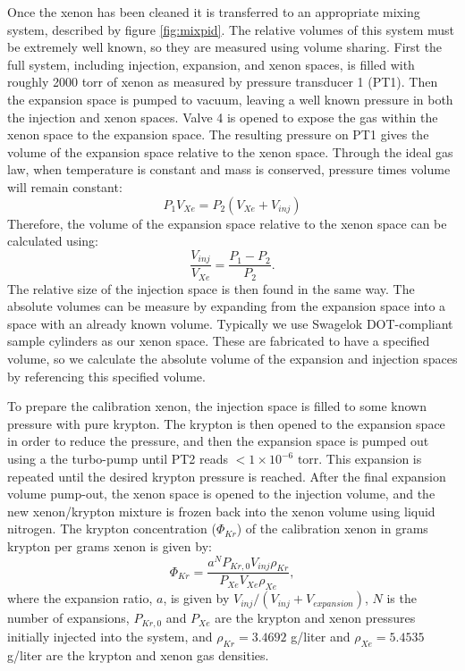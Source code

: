 Once the xenon has been cleaned it is transferred to an appropriate mixing system, described by figure \ref{fig:mixpid}. The relative volumes of this system must be extremely well known, so they are measured using volume sharing. First the full system, including injection, expansion, and xenon spaces, is filled with roughly 2000 torr of xenon as measured by pressure transducer 1 (PT1). Then the expansion space is pumped to vacuum, leaving a well known pressure in both the injection and xenon spaces. Valve 4 is opened to expose the gas within the xenon space to the expansion space. The resulting pressure on PT1 gives the volume of the expansion space relative to the xenon space. Through the ideal gas law, when temperature is constant and mass is conserved, pressure times volume will remain constant:
\begin{equation}
P_{1}V_{Xe} = P_{2}(V_{Xe}+V_{inj})
\end{equation}
Therefore, the volume of the expansion space relative to the xenon space can be calculated using:
\begin{equation}
\frac{V_{inj}}{V_{Xe}} = \frac{P_{1}-P_{2}}{P_{2}}.
\end{equation}
The relative size of the injection space is then found in the same way. The absolute volumes can be measure by expanding from the expansion space into a space with an already known volume. Typically we use Swagelok DOT-compliant sample cylinders as our xenon space. These are fabricated to have a specified volume, so we calculate the absolute volume of the expansion and injection spaces by referencing this specified volume.

To prepare the calibration xenon, the injection space is filled to some known pressure with pure krypton. The krypton is then opened to the expansion space in order to reduce the pressure, and then the expansion space is pumped out using a the turbo-pump until PT2 reads $<1\times10^{-6} \textrm{ torr}$. This expansion is repeated until the desired krypton pressure is reached. After the final expansion volume pump-out, the xenon space is opened to the injection volume, and the new xenon/krypton mixture is frozen back into the xenon volume using liquid nitrogen. The krypton concentration ($\Phi_{Kr}$) of the calibration xenon in grams krypton per grams xenon is given by:
\begin{equation}
\Phi_{Kr} = \frac{a^{N}P_{Kr,0}V_{inj}\rho_{Kr} }{P_{Xe}V_{Xe}\rho_{Xe}},
\end{equation}
where the expansion ratio, $a$, is given by $V_{inj}/(V_{inj}+V_{expansion})$, $N$ is the number of expansions, $P_{Kr,0}$ and $P_{Xe}$ are the krypton and xenon pressures initially injected into the system, and $\rho_{Kr}=3.4692$ g/liter and $\rho_{Xe}=5.4535$ g/liter are the krypton and xenon gas densities\cite{nist}.

